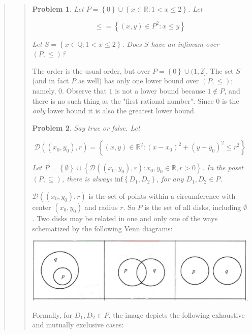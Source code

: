 \documentclass[a4paper, 12pt]{article}
\newtheorem{problem}{Problem}
\newtheorem{problem}{Problem}
\begin{document}
\begin{quote}
\begin{quote}
    \begin{problem}
        Let $P = \left\{ 0 \right\} \cup \left\{ x \in \mathbb{R} : 1 < x \leq 2
        \right\} $. Let 

        $$\leq = \left\{ (x, y) \in P^2 : x \leq y \right\} $$

        Let $S = \left\{ x \in \mathbb{Q} : 1 < x \leq 2 \right\} $. Does $S$
        have an infimum over $(P, \leq) $?
    \end{problem}

    The order is the usual order, but over $P = \left\{ 0 \right\}  \cup (1, 2]$.
    The set $S$ (and in fact $P$ as well) has only one lower bound over $(P,
    \leq) $; namely, $0$. Observe that $1$ is not a lower bound because $1
    \not\in P$, and there is no such thing as the "first rational number". Since
    $0$ is the \textit{only} lower bound it is also the greatest lower bound.

    \begin{problem}
        Say true or false. Let 

        $$\mathcal{D} \left( (x_0, y_0), r \right) = \left\{ (x, y) \in
        \mathbb{R}^2 : (x - x_0)^2 + (y - y_0)^2 \leq r^2 \right\} $$

        Let $P = \left\{ \emptyset \right\} \cup \left\{ \mathcal{D}\left( (x_0,
        y_0), r \right) : x_0, y_0 \in \mathbb{R}, r > 0  \right\} $. In the
        poset $(P, \subseteq ) $, there is always $\text{inf}\left\{ D_1, D_2
        \right\} $, for any $D_1, D_2 \in P$.
    \end{problem}

     $\mathcal{D}\left( (x_0, y_0), r \right) $ is the set of
     points within a circumference with center $(x_0, y_0)$ and radius $r$. So
     $P$ is the set of all disks, including $\emptyset$. Two disks may be
     related in one and only one of the ways schematized by the following Venn diagrams:


\begin{center}
\includegraphics[scale=0.2]{circles}
\end{center}

Formally, for $D_1, D_2 \in P$, the image depicts the following exhaustive and
mutually exclusive cases: 


\end{quote}
\end{quote}
\end{document}

